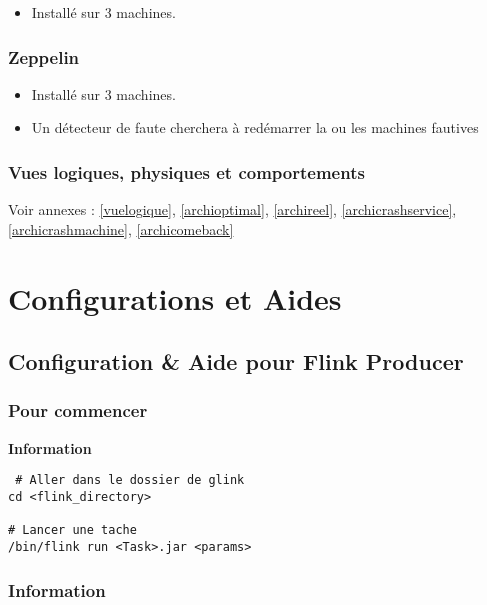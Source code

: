 \documentclass[a4paper,oneside,12pt]{article}
\begin{document}
\begin{itemize}
\item Installé sur 3 machines. 
\end{itemize}	

\subsubsection{Zeppelin}

\begin{itemize}
\item Installé sur 3 machines. 
\item Un détecteur de faute cherchera à redémarrer la ou les machines fautives 
\end{itemize}

\subsubsection{Vues logiques, physiques et comportements}

Voir annexes : \ref{vuelogique}, \ref{archioptimal}, \ref{archireel}, \ref{archicrashservice}, \ref{archicrashmachine}, \ref{archicomeback}



\pagebreak
\section{Configurations et Aides}

\subsection{Configuration \& Aide pour Flink Producer}

\subsubsection{Pour commencer}

\textbf{Information}

\begin{verbatim}
 # Aller dans le dossier de glink
cd <flink_directory>

# Lancer une tache
/bin/flink run <Task>.jar <params>
\end{verbatim}

\subsubsection{Information}
\end{document}
